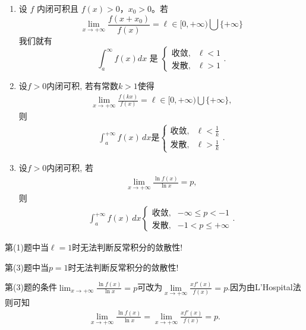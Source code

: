 \documentclass[../../main.tex]{subfiles}
\begin{document}
\begin{example}
\begin{enumerate}[(1)]
\item 设 \( f \) 内闭可积且 \( f(x) > 0 \)，\( x_0 > 0 \)。若
\[
\lim_{x \to +\infty} \frac{f(x + x_0)}{f(x)} = \ell \in [0, +\infty) \bigcup \{ +\infty \}
\]
我们就有
\[
\int_{a}^{\infty} f(x) dx \text{ 是 } 
\begin{cases} 
\text{收敛,} & \ell < 1 \\
\text{发散,} & \ell > 1 
\end{cases}.
\]

\item 设$f>0$内闭可积, 若有常数$k>1$使得
\begin{align*}
\lim_{x \to +\infty} \frac{f(kx)}{f(x)} = \ell \in [0, +\infty) \bigcup \{+\infty\},
\end{align*}
则
\begin{align*}
\int_a^{+\infty} f(x) \, dx \text{是} 
\begin{cases} 
\text{收敛}, & \ell < \tfrac{1}{k} \\
\text{发散}, & \ell > \tfrac{1}{k}
\end{cases}.
\end{align*}

\item 设$f>0$内闭可积, 若
\begin{align*}
\lim_{x \to +\infty} \frac{\ln f(x)}{\ln x} = p,
\end{align*}
则
\begin{align*}
\int_a^{+\infty} f(x) \, dx 
\begin{cases} 
\text{收敛}, & -\infty \leqslant p < -1 \\
\text{发散}, & -1 < p \leqslant +\infty
\end{cases}.
\end{align*}
\end{enumerate}
\end{example}
\begin{remark}
第(1)题中当$\ell =1$时无法判断反常积分的敛散性!

第(3)题中当$p =1$时无法判断反常积分的敛散性!
\end{remark}
\begin{remark}
第(3)题的条件$\lim_{x \to +\infty} \frac{\ln f(x)}{\ln x} = p$可改为$\underset{x\rightarrow +\infty}{\lim}\frac{xf' \left( x \right)}{f\left( x \right)}=p$.因为由L'Hospital法则可知
\begin{align*}
\lim_{x\rightarrow +\infty} \frac{\ln f(x)}{\ln x}=\underset{x\rightarrow +\infty}{\lim}\frac{xf' \left( x \right)}{f\left( x \right)}=p.
\end{align*}
\end{remark}
\end{document}
